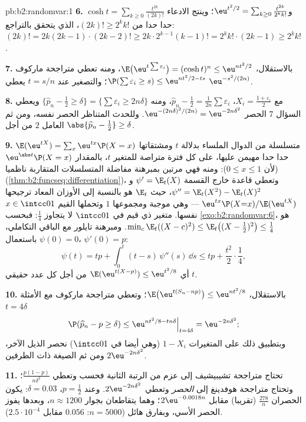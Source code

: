 \begin{solution}{pb:b2:randomvar:1}
\textbf{6.} $\cosh t = \sum_{k\geq0}\frac{t^{2k}}{(2k)!}$ و$\eu^{t^2/2} = \sum_{k\geq0}\frac{t^{2k}}{2^kk!}$؛ وينتج الادعاء حدا حدا من $(2k)! \geq 2^kk!$،
الذي يتحقق بالتراجع: $(2k)! = 2k(2k-1)\cdot(2k-2)! \geq 2k\cdot
2^{k-1}(k-1)! = 2^kk!\cdot(2k-1) \geq 2^kk!$.

\textbf{7.} بالاستقلال، $\E\bigl(\eu^{t\sum\varepsilon_i}
\bigr) = (\cosh t)^n \leq \eu^{nt^2/2}$، ومنه تعطي متراجحة ماركوف $\P(\sum\varepsilon_i \geq s) \leq \eu^{nt^2/2 - ts}$؛
والتصغير عند $t = s/n$ يعطي $\eu^{-s^2/(2n)}$.

\textbf{8.} مع $X_i = \frac{1 + \varepsilon_i}2$، $\widehat
p_n - \frac12 = \frac1{2n}\sum\varepsilon_i$، ومنه $\{\widehat p_n - \frac12 \geq \delta\} =
\{\sum\varepsilon_i \geq 2n\delta\}$ ويعطي السؤال 7 الحصر
$\eu^{-(2n\delta)^2/(2n)} = \eu^{-2n\delta^2}$. وللحدث المتناظر الحصر نفسه، ومن ثم العامل $2$ من أجل
$\abs{\widehat p_n - \frac12} \geq \delta$.

\textbf{9.} $\E(\eu^{tX}) = \sum_x\eu^{tx}\P(X = x)$ متسلسلة من الدوال الملساء بدلالة $t$
ومشتقاتها حدا حدا مهيمن عليها، على كل فترة متراصة للمتغير $t$،
بالمقدار $\eu^{\abs t}\P(X = x)$ (لأن $0 \leq x \leq 1$): ومنه فهي  مرتين بمبرهنة
مفاضلة المتسلسلات المتقاربة ناظميا (\cref{thm:b2:funcseq:differentiation})، وتعطي قاعدة خارج القسمة
$\psi' = \E_t(X)$ و$\psi'' = \E_t(X^2) - \E_t(X)^2$، حيث $\E_t$ هو  بالنسبة إلى الأوزان
المعاد ترجيحها $\eu^{tx}\P(X{=}x)/\E(\eu^{tX})$ --- وهي موجبة ومجموعها $1$ وتحملها القيم
$x \in \intcc01$ نفسها.  متغير ذي قيم في $\intcc01$ لا يتجاوز $\frac14$:
فبحسب \cref{exo:b2:randomvar:6}، هو $\min_c\E_t((X - c)^2) \leq
\E_t\bigl((X - \tfrac12)^2\bigr) \leq \tfrac14$. ومبرهنة تايلور مع الباقي التكاملي،
باستعمال $\psi(0) = 0$، $\psi'(0) = p$:
\[
\psi(t) = tp + \int_0^t(t - s)\,\psi''(s)\,\dd s
\leq tp + \frac{t^2}2\cdot\frac14,
\]
أي $\E(\eu^{t(X - p)}) \leq \eu^{t^2/8}$ من أجل كل عدد حقيقي $t$.

\textbf{10.} بالاستقلال، $\E\bigl(\eu^{t(S_n -
np)}\bigr) \leq \eu^{nt^2/8}$؛ وتعطي متراجحة ماركوف مع الأمثلة
$t
= 4\delta$
\[
\P(\widehat p_n - p \geq \delta)
\leq \eu^{nt^2/8 - tn\delta}\Big|_{t = 4\delta}
= \eu^{-2n\delta^2};
\]
وبتطبيق ذلك على المتغيرات $1 - X_i$ (وهي أيضا في $\intcc01$) نحصر الذيل
الآخر، ومن ثم الصيغة ذات الطرفين $2\eu^{-2n\delta^2}$.

\textbf{11.} تحتاج متراجحة تشيبيشيف إلى عزم من الرتبة الثانية فحسب
وتعطي $\frac{p(1-p)}{n\delta^2}$؛ وتحتاج متراجحة هوفدينغ إلى \emph{الحصر} وتعطي $2\eu^{-2n\delta^2}$.
وعند $p =
\frac12$، $\delta = 0.03$: يكون الحصران $\frac{278}{n}$ (تقريبا) مقابل $2\eu^{-0.0018n}$؛
وهما يتقاطعان بجوار $n \approx 1200$، وبعدها يفوز الحصر الأسي، وبفارق هائل
($n = 5000$: $0.056$ مقابل $2.5\cdot10^{-4}$).


\end{solution}
